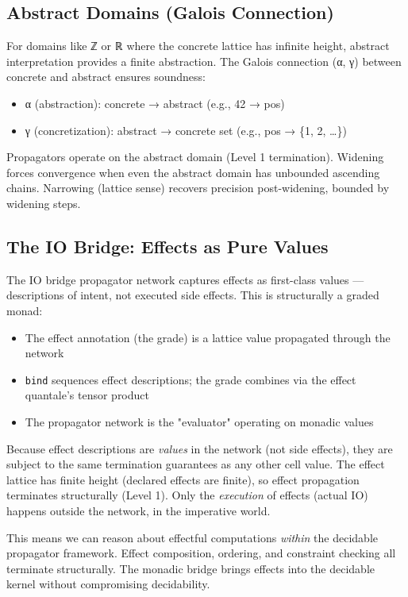 \documentclass[11pt]{article}
\begin{document}
\subsection{Abstract Domains (Galois Connection)}
\label{sec:org8730e0f}

For domains like ℤ or ℝ where the concrete lattice has infinite
height, abstract interpretation provides a finite abstraction. The
Galois connection (α, γ) between concrete and abstract ensures
soundness:

\begin{itemize}
\item α (abstraction): concrete → abstract (e.g., 42 → pos)
\item γ (concretization): abstract → concrete set (e.g., pos → \{1, 2, \ldots{}\})
\end{itemize}

Propagators operate on the abstract domain (Level 1 termination).
Widening forces convergence when even the abstract domain has
unbounded ascending chains. Narrowing (lattice sense) recovers
precision post-widening, bounded by widening steps.
\subsection{The IO Bridge: Effects as Pure Values}
\label{sec:org7129047}

The IO bridge propagator network captures effects as first-class
values --- descriptions of intent, not executed side effects. This is
structurally a graded monad:

\begin{itemize}
\item The effect annotation (the grade) is a lattice value propagated
through the network
\item \texttt{bind} sequences effect descriptions; the grade combines via the
effect quantale's tensor product
\item The propagator network is the "evaluator" operating on monadic values
\end{itemize}

Because effect descriptions are \emph{values} in the network (not side
effects), they are subject to the same termination guarantees as any
other cell value. The effect lattice has finite height (declared
effects are finite), so effect propagation terminates structurally
(Level 1). Only the \emph{execution} of effects (actual IO) happens
outside the network, in the imperative world.

This means we can reason about effectful computations \emph{within} the
decidable propagator framework. Effect composition, ordering, and
constraint checking all terminate structurally. The monadic bridge
brings effects into the decidable kernel without compromising
decidability.
\end{document}
